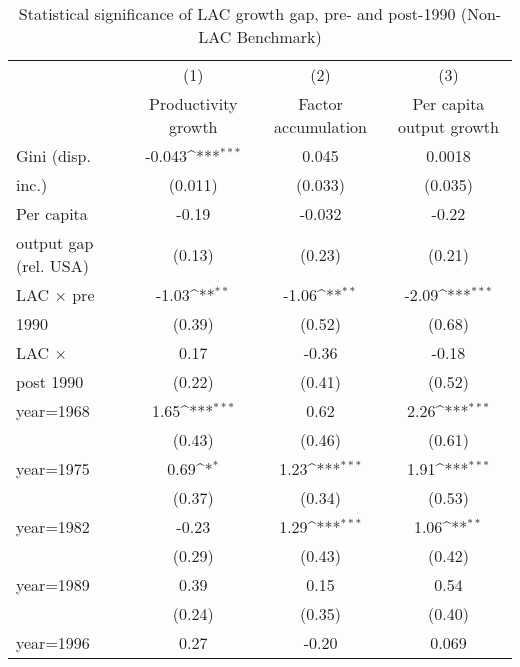 \begin{sidewaystable}[htbp]\centering
\def\sym#1{\ifmmode^{#1}\else\(^{#1}\)\fi}
\caption{Statistical significance of LAC growth gap, pre- and post-1990 (Non-LAC Benchmark)}
\begin{tabular}{l*{3}{c}}
\toprule
                &\multicolumn{1}{c}{(1)}&\multicolumn{1}{c}{(2)}&\multicolumn{1}{c}{(3)}\\
                &\multicolumn{1}{c}{Productivity growth}&\multicolumn{1}{c}{Factor accumulation}&\multicolumn{1}{c}{Per capita output growth}\\
\midrule
Gini (disp.     &   -0.043\sym{***}&    0.045         &   0.0018         \\
inc.)           &  (0.011)         &  (0.033)         &  (0.035)         \\
\addlinespace
Per capita      &    -0.19         &   -0.032         &    -0.22         \\
output gap (rel. USA)&   (0.13)         &   (0.23)         &   (0.21)         \\
\addlinespace
LAC $\times$ pre&    -1.03\sym{**} &    -1.06\sym{**} &    -2.09\sym{***}\\
1990            &   (0.39)         &   (0.52)         &   (0.68)         \\
\addlinespace
LAC $\times$    &     0.17         &    -0.36         &    -0.18         \\
post 1990       &   (0.22)         &   (0.41)         &   (0.52)         \\
\addlinespace
year=1968       &     1.65\sym{***}&     0.62         &     2.26\sym{***}\\
                &   (0.43)         &   (0.46)         &   (0.61)         \\
\addlinespace
year=1975       &     0.69\sym{*}  &     1.23\sym{***}&     1.91\sym{***}\\
                &   (0.37)         &   (0.34)         &   (0.53)         \\
\addlinespace
year=1982       &    -0.23         &     1.29\sym{***}&     1.06\sym{**} \\
                &   (0.29)         &   (0.43)         &   (0.42)         \\
\addlinespace
year=1989       &     0.39         &     0.15         &     0.54         \\
                &   (0.24)         &   (0.35)         &   (0.40)         \\
\addlinespace
year=1996       &     0.27         &    -0.20         &    0.069         \\

\end{tabular}
\end{sidewaystable}
